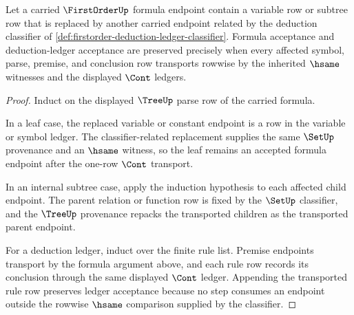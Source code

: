 \begin{theorem}\label{thm:firstorder-substitution-transport-obligation}
Let a carried $\FirstOrderUp$ formula endpoint contain a variable row or
subtree row that is replaced by another carried endpoint related by the
deduction classifier of
\autoref{def:firstorder-deduction-ledger-classifier}. Formula acceptance and
deduction-ledger acceptance are preserved precisely when every affected
symbol, parse, premise, and conclusion row transports rowwise by the inherited
$\hsame$ witnesses and the displayed $\Cont$ ledgers.
\end{theorem}
\begin{proof}
Induct on the displayed $\TreeUp$ parse row of the carried formula.

In a leaf case, the replaced variable or constant endpoint is a row in the
variable or symbol ledger. The classifier-related replacement supplies the
same $\SetUp$ provenance and an $\hsame$ witness, so the leaf remains an
accepted formula endpoint after the one-row $\Cont$ transport.

In an internal subtree case, apply the induction hypothesis to each affected
child endpoint. The parent relation or function row is fixed by the
$\SetUp$ classifier, and the $\TreeUp$ provenance repacks the transported
children as the transported parent endpoint.

For a deduction ledger, induct over the finite rule list. Premise endpoints
transport by the formula argument above, and each rule row records its
conclusion through the same displayed $\Cont$ ledger. Appending the
transported rule row preserves ledger acceptance because no step consumes an
endpoint outside the rowwise $\hsame$ comparison supplied by the classifier.
\end{proof}

